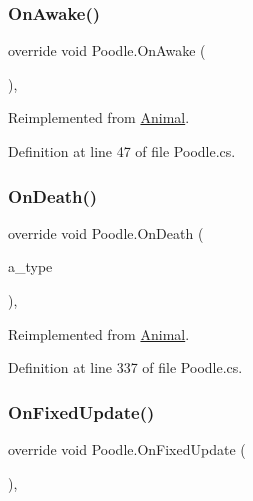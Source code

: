 \subsubsection{\texorpdfstring{On\+Awake()}{OnAwake()}}
{\footnotesize\ttfamily override void Poodle.\+On\+Awake (\begin{DoxyParamCaption}{ }\end{DoxyParamCaption})\hspace{0.3cm}{\ttfamily [protected]}, {\ttfamily [virtual]}}



Reimplemented from \mbox{\hyperlink{class_animal_a8ed14f752254b7033466bbd0c846a972}{Animal}}.



Definition at line 47 of file Poodle.\+cs.

\mbox{\label{class_poodle_a86cc87a183e2b7b2297d9481c2c0d416}} 
\subsubsection{\texorpdfstring{On\+Death()}{OnDeath()}}
{\footnotesize\ttfamily override void Poodle.\+On\+Death (\begin{DoxyParamCaption}\item[{\mbox{\hyperlink{_animal_8cs_aa09ea87b75a706096f010aef7b9b1826}{D\+E\+A\+T\+H\+\_\+\+T\+Y\+PE}}}]{a\+\_\+type }\end{DoxyParamCaption})\hspace{0.3cm}{\ttfamily [protected]}, {\ttfamily [virtual]}}



Reimplemented from \mbox{\hyperlink{class_animal_a86612d846fcd1fcf08f7b89586aa11b7}{Animal}}.



Definition at line 337 of file Poodle.\+cs.

\mbox{\label{class_poodle_a43c5147cedef40592b077814bffda480}} 
\subsubsection{\texorpdfstring{On\+Fixed\+Update()}{OnFixedUpdate()}}
{\footnotesize\ttfamily override void Poodle.\+On\+Fixed\+Update (\begin{DoxyParamCaption}{ }\end{DoxyParamCaption})\hspace{0.3cm}{\ttfamily [protected]}, {\ttfamily [virtual]}}



